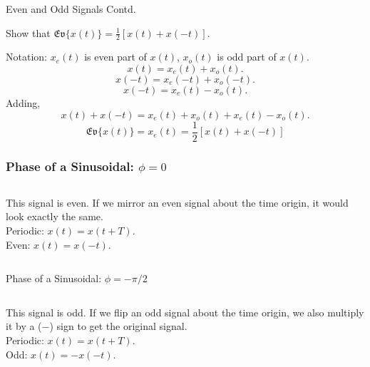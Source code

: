 \begin{frame}[t]{Even and Odd Signals Contd.}
    \begin{example}
        Show that $\mathfrak{Ev}\{x(t)\} = \frac{1}{2}[x(t)+x(-t)]$.
    \end{example}
    Notation: $x_e(t)$ is even part of $x(t)$, $x_o(t)$ is odd part of $x(t)$.
    {
        \begin{equation*}
            x(t) = x_e(t) + x_o(t).
        \end{equation*}
        \pause
        \begin{equation*}
            x(-t) = x_e(-t) + x_o(-t).
        \end{equation*}
        \pause
        \begin{equation*}
            x(-t) = x_e(t) - x_o(t).
        \end{equation*}
        \pause
        Adding,
        \begin{equation*}
            x(t) + x(-t) = x_e(t) + x_o(t) + x_e(t) - x_o(t).
        \end{equation*}
        \pause
        \begin{equation*}
            \mathfrak{Ev}\{x(t)\} =  x_e(t) = \frac{1}{2}[x(t)+x(-t)]
        \end{equation*}
    }
\end{frame}


\begin{frame}[plain]\frametitle{Phase of a Sinusoidal: $\phi = 0$}
    {
        \begin{columns}[t]
            {
                \centering
                
            }
            {
                \noindent This signal is \alert{even}. If we mirror an even signal about the time origin, it would look exactly the same.\\[12pt]
                Periodic: $x(t) = x(t+ T)$.\\
                Even: $x(t) = x(-t)$.
            }
        \end{columns}
    }
\end{frame}

\begin{frame}[plain]{Phase of a Sinusoidal: $\phi = -\pi/2$}
    {
        \begin{columns}[t]
            {
                \centering
                
            }
            {
                \noindent This signal is \alert{odd}. If we flip an odd signal about the time origin, we also multiply it by a ($-$) sign to get the original signal.\\[12pt]
                Periodic: $x(t) = x(t+ T)$.\\
                Odd: $x(t) = -x(-t)$.
            }
        \end{columns}
    }
\end{frame}

